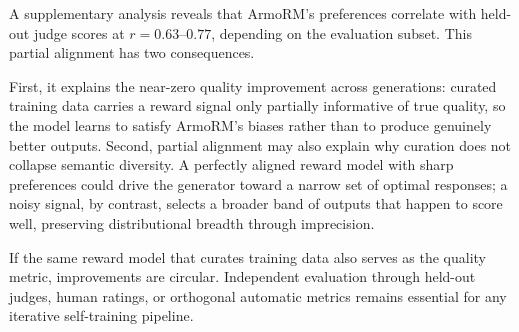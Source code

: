 A supplementary analysis reveals that ArmoRM's preferences correlate with held-out judge scores at $r = 0.63$--$0.77$, depending on the evaluation subset. This partial alignment has two consequences.

First, it explains the near-zero quality improvement across generations: curated training data carries a reward signal only partially informative of true quality, so the model learns to satisfy ArmoRM's biases rather than to produce genuinely better outputs. Second, partial alignment may also explain why curation does not collapse semantic diversity. A perfectly aligned reward model with sharp preferences could drive the generator toward a narrow set of optimal responses; a noisy signal, by contrast, selects a broader band of outputs that happen to score well, preserving distributional breadth through imprecision.

If the same reward model that curates training data also serves as the quality metric, improvements are circular. Independent evaluation through held-out judges, human ratings, or orthogonal automatic metrics remains essential for any iterative self-training pipeline.
